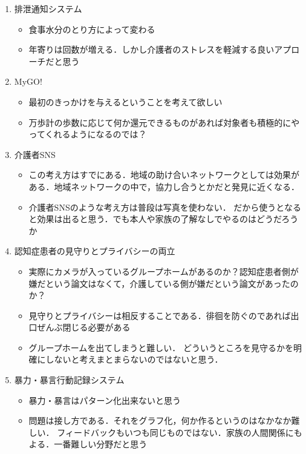 \documentclass[../report]{subfiles}
\begin{document}
\begin{enumerate}
    \item[] 排泄通知システム
\begin{itemize}
    \item 食事水分のとり方によって変わる
    \item 年寄りは回数が増える．しかし介護者のストレスを軽減する良いアプローチだと思う
\end{itemize}

    \item[] MyGO!
\begin{itemize}
    \item 最初のきっかけを与えるということを考えて欲しい
    \item 万歩計の歩数に応じて何か還元できるものがあれば対象者も積極的にやってくれるようになるのでは？
\end{itemize}

    \item[] 介護者SNS
\begin{itemize}
    \item この考え方はすでにある．地域の助け合いネットワークとしては効果がある．地域ネットワークの中で，協力し合うとかだと発見に近くなる．
    \item 介護者SNSのような考え方は普段は写真を使わない．
だから使うとなると効果は出ると思う．でも本人や家族の了解なしでやるのはどうだろうか
\end{itemize}

    \item[] 認知症患者の見守りとプライバシーの両立
\begin{itemize}
    \item 実際にカメラが入っているグループホームがあるのか？認知症患者側が嫌だという論文はなくて，介護している側が嫌だという論文があったのか？
    \item 見守りとプライバシーは相反することである．徘徊を防ぐのであれば出口ぜんぶ閉じる必要がある
    \item グループホームを出てしまうと難しい．
どういうところを見守るかを明確にしないと考えまとまらないのではないと思う．
\end{itemize}

    \item[] 暴力・暴言行動記録システム
\begin{itemize}
    \item 暴力・暴言はパターン化出来ないと思う
    \item 問題は接し方である．それをグラフ化，何か作るというのはなかなか難しい．
フィードバックもいつも同じものではない．家族の人間関係にもよる．一番難しい分野だと思う
\end{itemize}
\end{enumerate}
\end{document}
